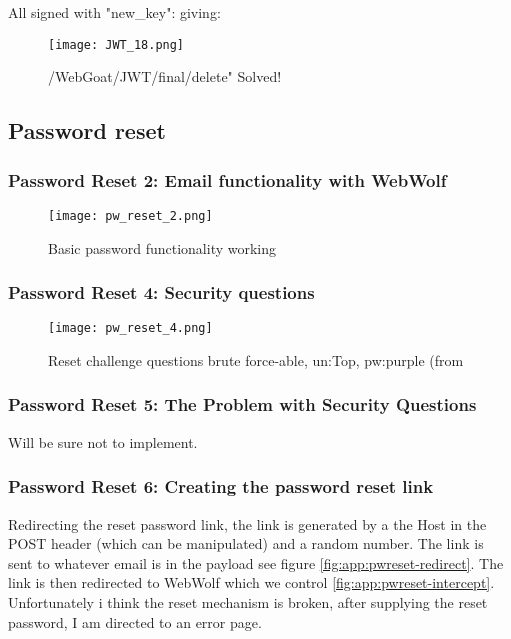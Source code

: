 \documentclass[
	letterpaper, %
	10pt, %
	unnumberedsections, %
	twoside, %
]{APAAssignment}
\begin{document}
\begin{appendices}
All signed with "new\_key": giving:

\begin{figure}[!ht] %
	\centering
	\texttt{[image: JWT\_18.png]}
	\caption{/WebGoat/JWT/final/delete" Solved!}
	\label{fig:app:JWT18}
\end{figure}

\subsection{Password reset}

\subsubsection{Password Reset 2: Email functionality with WebWolf}

\begin{figure}[!ht] %
	\centering
	\texttt{[image: pw\_reset\_2.png]}
	\caption{Basic password functionality working}
	\label{fig:app:pw_reset_2}
\end{figure}

\subsubsection{Password Reset 4: Security questions}

\begin{figure}[!ht] %
	\centering
	\texttt{[image: pw\_reset\_4.png]}
	\caption{Reset challenge questions brute force-able, un:Top, pw:purple (from \cite{CycubicsDocsWebGoat}}
	\label{fig:app:pw_reset_4}
\end{figure}

\subsubsection{Password Reset 5: The Problem with Security Questions}
Will be sure not to implement.


\subsubsection{Password Reset 6: Creating the password reset link}

Redirecting the reset password link, the link is generated by a the Host in the POST header (which can be manipulated) and a  random number. The link is sent to whatever email is in the payload see figure \ref{fig:app:pwreset-redirect}. The link is then redirected to WebWolf which we control \ref{fig:app:pwreset-intercept}. Unfortunately i think the reset mechanism is broken, after supplying the reset password, I am directed to an error page. 


\end{appendices}
\end{document}
